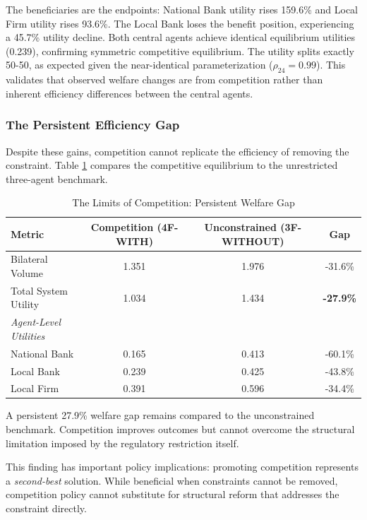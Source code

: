 \documentclass[12pt]{article}
\begin{document}
The beneficiaries are the endpoints: National Bank utility rises 159.6\% and Local Firm utility rises 93.6\%. The Local Bank loses the benefit position, experiencing a 45.7\% utility decline. Both central agents achieve identical equilibrium utilities (0.239), confirming symmetric competitive equilibrium. The utility splits exactly 50-50, as expected given the near-identical parameterization ($\rho_{24} = 0.99$). This validates that observed welfare changes are from competition rather than inherent efficiency differences between the central agents.

\subsubsection{The Persistent Efficiency Gap}

Despite these gains, competition cannot replicate the efficiency of removing the constraint. Table \ref{tab:competition_vs_unconstrained} compares the competitive equilibrium to the unrestricted three-agent benchmark.

\begin{table}[h]
\centering
\caption{The Limits of Competition: Persistent Welfare Gap}
\label{tab:competition_vs_unconstrained}
\begin{tabular}{lccc}
\toprule
\textbf{Metric} & \textbf{Competition (4F-WITH)} & \textbf{Unconstrained (3F-WITHOUT)} & \textbf{Gap} \\
\midrule
Bilateral Volume & 1.351 & 1.976 & -31.6\% \\
Total System Utility & 1.034 & 1.434 & \textbf{-27.9\%} \\
\midrule
\textit{Agent-Level Utilities} & & & \\
\quad National Bank & 0.165 & 0.413 & -60.1\% \\
\quad Local Bank & 0.239 & 0.425 & -43.8\% \\
\quad Local Firm & 0.391 & 0.596 & -34.4\% \\
\bottomrule
\end{tabular}
\end{table}

A persistent 27.9\% welfare gap remains compared to the unconstrained benchmark. Competition improves outcomes but cannot overcome the structural limitation imposed by the regulatory restriction itself.

This finding has important policy implications: promoting competition represents a \textit{second-best} solution. While beneficial when constraints cannot be removed, competition policy cannot substitute for structural reform that addresses the constraint directly.
\end{document}
